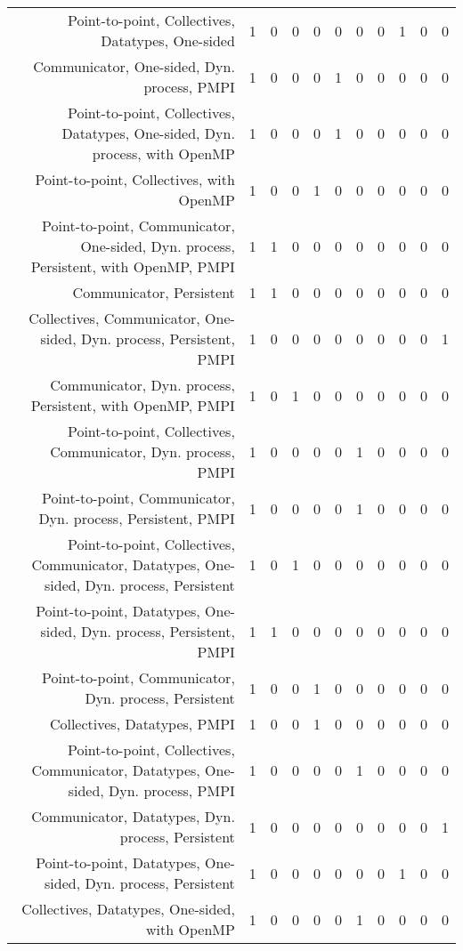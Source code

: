 {\begin{landscape}
\begin{longtable}[htb]{r|c|c|c|c|c|c|c|c|c|c}
{Point-to-point, Collectives, Datatypes, One-sided} & 1 & 0 & 0 & 0 & 0 & 0 & 0 & 1 & 0 & 0 \\%
{Communicator, One-sided, Dyn. process, PMPI} & 1 & 0 & 0 & 0 & 1 & 0 & 0 & 0 & 0 & 0 \\%
{Point-to-point, Collectives, Datatypes, One-sided, Dyn. process, with OpenMP} & 1 & 0 & 0 & 0 & 1 & 0 & 0 & 0 & 0 & 0 \\%
{Point-to-point, Collectives, with OpenMP} & 1 & 0 & 0 & 1 & 0 & 0 & 0 & 0 & 0 & 0 \\%
{Point-to-point, Communicator, One-sided, Dyn. process, Persistent, with OpenMP, PMPI} & 1 & 1 & 0 & 0 & 0 & 0 & 0 & 0 & 0 & 0 \\%
{Communicator, Persistent} & 1 & 1 & 0 & 0 & 0 & 0 & 0 & 0 & 0 & 0 \\%
{Collectives, Communicator, One-sided, Dyn. process, Persistent, PMPI} & 1 & 0 & 0 & 0 & 0 & 0 & 0 & 0 & 0 & 1 \\%
{Communicator, Dyn. process, Persistent, with OpenMP, PMPI} & 1 & 0 & 1 & 0 & 0 & 0 & 0 & 0 & 0 & 0 \\%
{Point-to-point, Collectives, Communicator, Dyn. process, PMPI} & 1 & 0 & 0 & 0 & 0 & 1 & 0 & 0 & 0 & 0 \\%
{Point-to-point, Communicator, Dyn. process, Persistent, PMPI} & 1 & 0 & 0 & 0 & 0 & 1 & 0 & 0 & 0 & 0 \\%
{Point-to-point, Collectives, Communicator, Datatypes, One-sided, Dyn. process, Persistent} & 1 & 0 & 1 & 0 & 0 & 0 & 0 & 0 & 0 & 0 \\%
{Point-to-point, Datatypes, One-sided, Dyn. process, Persistent, PMPI} & 1 & 1 & 0 & 0 & 0 & 0 & 0 & 0 & 0 & 0 \\%
{Point-to-point, Communicator, Dyn. process, Persistent} & 1 & 0 & 0 & 1 & 0 & 0 & 0 & 0 & 0 & 0 \\%
{Collectives, Datatypes, PMPI} & 1 & 0 & 0 & 1 & 0 & 0 & 0 & 0 & 0 & 0 \\%
{Point-to-point, Collectives, Communicator, Datatypes, One-sided, Dyn. process, PMPI} & 1 & 0 & 0 & 0 & 0 & 1 & 0 & 0 & 0 & 0 \\%
{Communicator, Datatypes, Dyn. process, Persistent} & 1 & 0 & 0 & 0 & 0 & 0 & 0 & 0 & 0 & 1 \\%
{Point-to-point, Datatypes, One-sided, Dyn. process, Persistent} & 1 & 0 & 0 & 0 & 0 & 0 & 0 & 1 & 0 & 0 \\%
{Collectives, Datatypes, One-sided, with OpenMP} & 1 & 0 & 0 & 0 & 0 & 1 & 0 & 0 & 0 & 0 \\%

\end{longtable}
\end{landscape}}
